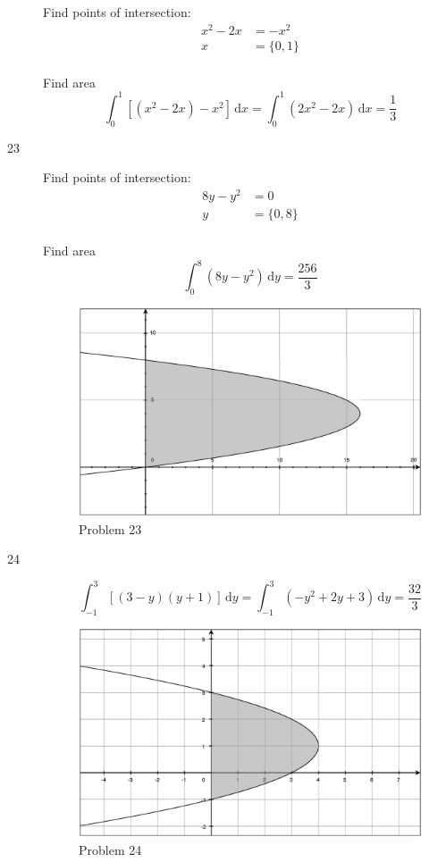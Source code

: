\documentclass{exam}
\begin{document}
\begin{description}
Find points of intersection:
\begin{align*}
  x^2 - 2x &= -x^2 \\
  x &= \{0, 1\} \\
\end{align*}

Find area
\[
  \int_0^1 [ (x^2 - 2x) - x^2 ] \, \mathrm{d}x = \int_0^1 (2x^2 - 2x) \, \mathrm{d}x = \frac{1}{3}
\] 

\item[23]
Find points of intersection:
\begin{align*}
  8y - y^2 &= 0 \\
  y &= \{0, 8\} \\
\end{align*}

Find area
\[
  \int_0^8 (8y - y^2) \, \mathrm{d}y = \frac{256}{3}
\] 

\begin{figure}[H]
  \centering
  \includegraphics[scale=.3]{problem_23.eps}
  \caption*{Problem 23}
\end{figure}

\item[24]
\[
  \int_{-1}^3 [(3 - y)(y+1) ] \, \mathrm{d}y = \int_{-1}^3 (-y^2 + 2y + 3) \, \mathrm{d}y = \frac{32}{3}
\] 

\begin{figure}[H]
  \centering
  \includegraphics[scale=.3]{problem_24.eps}
  \caption*{Problem 24}
\end{figure}


\end{description}
\end{document}
